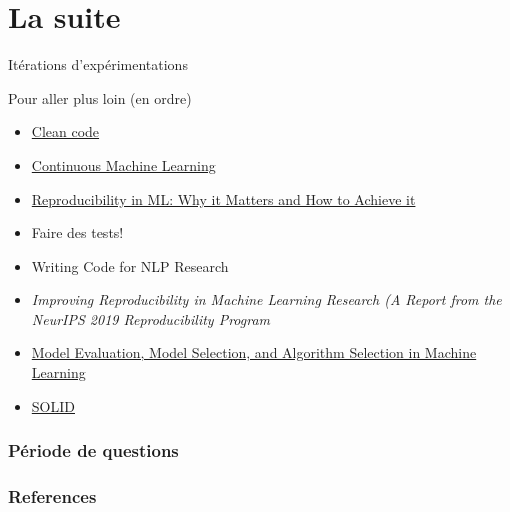 \documentclass[aspectratio=169,10pt,xcolor=x11names,english,french]{beamer}
\begin{document}
	\section{La suite}
	\begin{frame}
		\centering
		\fontsize{35}{35}\faRefresh\vfil
		\vspace{1em}
		\normalsize Itérations d'expérimentations
	\end{frame}
	
	\begin{frame}{Pour aller plus loin (en ordre)}
		\begin{itemize}
			\item \href{https://www.oreilly.com/library/view/clean-code-a/9780136083238/}{Clean code}
			\item \href{https://github.com/iterative/cml}{Continuous Machine Learning}
			\item \href{https://determined.ai/blog/reproducibility-in-ml/}{Reproducibility in ML: Why it Matters and How to Achieve it}
			\item Faire des tests!
			\item Writing Code for NLP Research \cite{gardner-etal-2018-writing}
			\item \textit{Improving Reproducibility in Machine Learning Research (A Report from the NeurIPS 2019 Reproducibility Program} \cite{pineau2020improving}
			\item \href{https://sebastianraschka.com/blog/2018/model-evaluation-selection-part4.html}{Model Evaluation, Model Selection, and Algorithm Selection in Machine Learning}
			\item \href{https://www.youtube.com/watch?v=t86v3N4OshQ&list=LLFp5G_2HoipBrGaw9iAcPPw&index=693}{SOLID}
		\end{itemize}
	\end{frame}
	
	\begin{frame}
		\frametitle{Période de questions}
		
		\centering
		\fontsize{100}{100}
		\faQuestion
		
	\end{frame}

	
	
	\begin{frame}[t, allowframebreaks]
		\frametitle{References}
		
		
	\end{frame}
	
	
	
\end{document}
